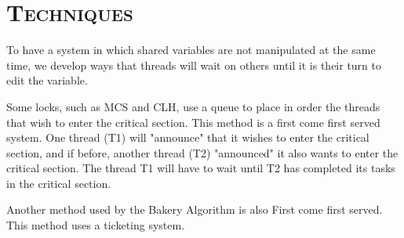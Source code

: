 \documentclass[FinalReport.tex]{subfiles}
\begin{document}
\bigskip

\section*{\textsc{\Large Techniques}}

	To have a system in which shared variables are not manipulated at the same time, we develop ways that threads will wait on others until it is their turn to edit the variable.  
	
	Some locks, such as MCS and CLH, use a queue to place in order the threads that wish to enter the critical section.  This method is a first come first served system.  One thread (T1) will "announce" that it wishes to enter the critical section, and if before, another thread (T2) "announced" it also wants to enter the critical section.  The thread T1 will have to wait until T2 has completed its tasks in the critical section.
	
	Another method used by the Bakery Algorithm is also First come first served.  This method uses a ticketing system.  
\end{document}
